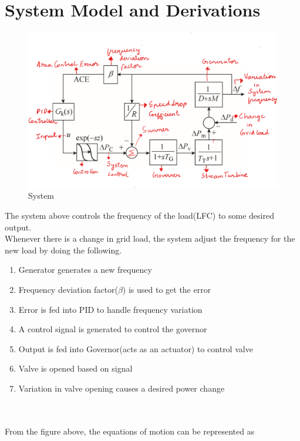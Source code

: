 \documentclass[journal]{IEEEtran}
\begin{document}
\section{System Model and Derivations}

\begin{figure}
\includegraphics[width=\linewidth]{systemmodel.png}
  \caption{System}
  \label{fig:System1}
\end{figure}


The system above controls the frequency of the load(LFC) to some desired output. \\

Whenever there is a change in grid load, the system adjust the frequency for the new load by 
doing the following.

\begin{enumerate} 
  \item Generator generates a new frequency 
  \item Frequency deviation factor($\beta$) is used to get the error
  \item Error is fed into PID to handle frequency variation
  \item A control signal is generated to control the governor
  \item Output is fed into Governor(acts as an actuator) to control valve
  \item Valve is opened based on signal
  \item Variation in valve opening causes a desired power change  
 \end{enumerate} \\ \\
From the figure above, the equations of motion can be represented as 
\end{document}
